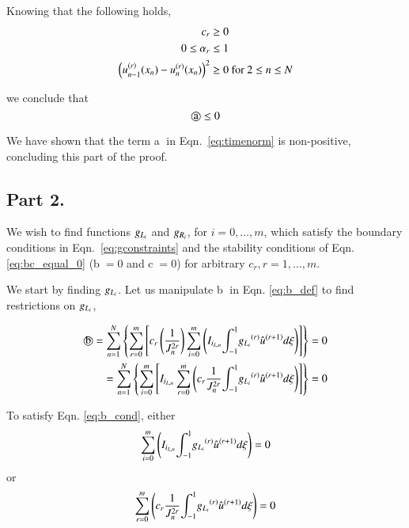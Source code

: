 Knowing that the following holds,
\begin{equation}
 \begin{split}
  c_r &\ge 0\\
  0 \le \alpha_r &\le 1\\
  \left({{u}^{(r)}_{n-1}(x_{n})} - {{u}^{(r)}_{n}(x_{n})} \right)^2 &\ge 0  \mbox{ for } 2\le n \le N
 \end{split}
\end{equation}

we conclude that
\begin{equation}
 \text{\textcircled{a}} \le 0
\end{equation}


We have shown that the term \textcircled{a} in Eqn.~\eqref{eq:timenorm} is non-positive,
concluding this part of the proof.


\subsection{Part 2.}
We wish to find functions ${g_{L_i}} $ and ${g_{R_i}} $, for $i = 0,\ldots,m $,
which satisfy the boundary conditions in Eqn.~\eqref{eq:gconstraints} and the stability conditions of Eqn. \eqref{eq:bc_equal_0} (\textcircled{b}$=0$
and \textcircled{c}$=0$) for arbitrary
$c_r, r=1,\ldots,m$.

We start by finding ${g_{L_i}}$. Let us manipulate \textcircled{b} in Eqn. \eqref{eq:b_def} to find restrictions on ${g_{L_i}}$,

\begin{equation}
\begin{split}\label{eq:b_cond}
 \text{\textcircled{b}} = \sum_{n=1}^{N} \left\{ 
 \sum^m_{r=0} \left[ c_r \left(
 \frac{1}{J_n^{2r}}\right) \sum^m_{i=0} \left( {I_{i_{L,n}}} {\int^1_{-1}} {{g_{L_i}}}^{\left(r\right)} \hat{u}^{{ (r+1)}} d\xi \right) \right] \right\} &=0 \\
 = \sum_{n=1}^{N} \left\{ 
  \sum^m_{i=0} \left[ {I_{i_{L,n}}} \sum^m_{r=0} \left( c_r 
  \frac{1}{J_n^{2r}}  {\int^1_{-1}} {{g_{L_i}}}^{\left(r\right)} \hat{u}^{{ (r+1)}} d\xi \right) \right] \right\} &=0
 \end{split}
\end{equation}

To satisfy Eqn. \eqref{eq:b_cond}, either
\begin{equation}
\label{eq:optionA}
\sum^m_{i=0}\left( {I_{i_{L,n}}} {\int^1_{-1}} {{g_{L_i}}}^{\left(r\right)} \hat{u}^{{ (r+1)}}
d\xi \right) =0 
\end{equation}
or
\begin{equation}\label{eq:optionB}
\sum^m_{r=0} \left( c_r 
  \frac{1}{J_n^{2r}}  {\int^1_{-1}} {{g_{L_i}}}^{\left(r\right)} \hat{u}^{{ (r+1)}} d\xi \right) =0
\end{equation}


